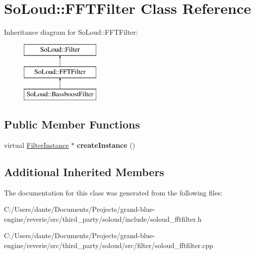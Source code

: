 \hypertarget{class_so_loud_1_1_f_f_t_filter}{}\section{So\+Loud\+::F\+F\+T\+Filter Class Reference}
\label{class_so_loud_1_1_f_f_t_filter}
Inheritance diagram for So\+Loud\+::F\+F\+T\+Filter\+:\begin{figure}[H]
\begin{center}
\leavevmode
\includegraphics[height=3.000000cm]{class_so_loud_1_1_f_f_t_filter}
\end{center}
\end{figure}
\subsection*{Public Member Functions}
\begin{DoxyCompactItemize}
\item 
\mbox{\label{class_so_loud_1_1_f_f_t_filter_aec10fbdef8ef95582029ff696dc6787b}} 
virtual \mbox{\hyperlink{class_so_loud_1_1_filter_instance}{Filter\+Instance}} $\ast$ {\bfseries create\+Instance} ()
\end{DoxyCompactItemize}
\subsection*{Additional Inherited Members}


The documentation for this class was generated from the following files\+:\begin{DoxyCompactItemize}
\item 
C\+:/\+Users/dante/\+Documents/\+Projects/grand-\/blue-\/engine/reverie/src/third\+\_\+party/soloud/include/soloud\+\_\+fftfilter.\+h\item 
C\+:/\+Users/dante/\+Documents/\+Projects/grand-\/blue-\/engine/reverie/src/third\+\_\+party/soloud/src/filter/soloud\+\_\+fftfilter.\+cpp\end{DoxyCompactItemize}
